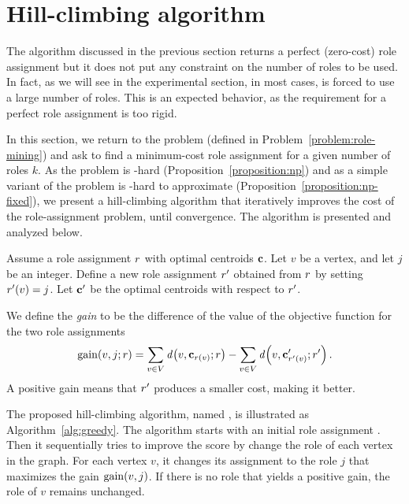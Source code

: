 \section{Hill-climbing algorithm}
\label{section:greedy}

The algorithm discussed in the previous section
returns a perfect (zero-cost) role assignment
but it does not put any constraint on the number of roles to be used.
In fact, as we will see in the experimental section, 
in most cases, \algperfect is forced to use a large number of roles. 
This is an expected behavior, 
as the requirement for a perfect role assignment is too rigid.

In this section, we return to the \prbrm problem
(defined in Problem~\ref{problem:role-mining})
and ask to find a minimum-cost role assignment
for a given number of roles $k$.
As the \prbrm problem is \np-hard (Proposition~\ref{proposition:np}) and
as a simple variant of the problem is \np-hard to approximate (Proposition~\ref{proposition:np-fixed}), 
we present a hill-climbing algorithm
that iteratively improves the cost of the role-assignment problem, 
until convergence.
The algorithm is presented and analyzed below.

Assume a role assignment $r$ with optimal centroids $\mathbf{c}$. 
Let $v$ be a vertex, and let $j$ be an integer.
Define a new role assignment $r'$ obtained from $r$ by setting $r'(v) = j$.
Let $\mathbf{c}'$ be the optimal centroids with respect to $r'$.

We define the \emph{gain} to be the difference
of the value of the objective function for the two role assignments 
\[
\gain{v, j; \role} = 
	\sum_{v \in V} \dist{v, \centroid_{\role(v)}; \role} - \sum_{v \in V} \dist{v, \centroid'_{\role'(v)}; \role'}.
\]
A positive gain means that $r'$ produces a smaller cost, making it better.

\iffalse
i -> j
\[
	- c_i\norm{\centroid_i}^2 + (c_i - 1)\norm{\centroid_i'}^2
	+ c_j\norm{\centroid_j}^2 - (c_i + 1)\norm{\centroid_j'}^2
\]

\[
	+ \prof{w}_i^2  -  (\prof{w}_i - 1)^2
	- \prof{w}_j^2  +  (\prof{w}_j - 1)^2
\]

\[
	2\prof{w}_i - 2\prof{w}_j 
\]

\[
	-c_\ell ((\centroid_\ell)^2_i - (\centroid_\ell')^2_i
	-(\centroid_\ell)^2_j + (\centroid_\ell')^2_j)
\]

\[
	- 2(\centroid_\ell)_i  + 2(\centroid_\ell)_j  
\]
\fi

The proposed hill-climbing algorithm,
named \alggreedy, 
is illustrated as Algorithm~\ref{alg:greedy}. 
The algorithm starts with an initial role assignment {\role}.
Then it sequentially tries to improve the score by change the role of each vertex in the graph.
For each vertex $v$, it changes its assignment to the role $j$
that maximizes the gain $\gain{v, j}$. 
If there is no role that yields a positive gain, 
the role of $v$ remains unchanged.

